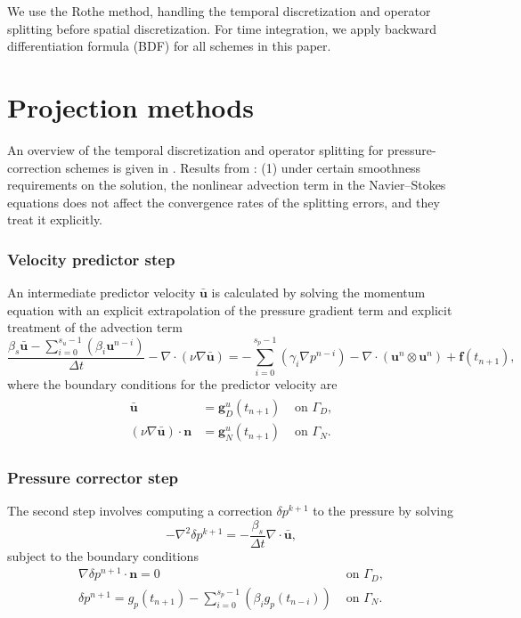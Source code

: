 We use the Rothe method, handling the temporal discretization and operator splitting before spatial discretization. For time integration, we apply backward differentiation formula (BDF) for all schemes in this paper.

\section{Projection methods}%

An overview of the temporal discretization and operator splitting for pressure-correction schemes is given in \cite{guermond_overview_2006}. Results from \cite{guermond_overview_2006}: (1) under certain smoothness requirements on the solution, the nonlinear advection term in the Navier--Stokes equations does not affect the convergence rates of the splitting errors, and they treat it explicitly. 

\subsubsection{Velocity predictor step}
An intermediate predictor velocity $\bar{\bm{u}}$ is calculated by solving the momentum equation with an explicit extrapolation of the pressure gradient term and explicit treatment of the advection term
\begin{equation}
\frac{ \beta_s \bar{\bm{u}} - \sum_{i=0}^{s_u-1}\left(\beta_i \bm{u}^{n-i}\right) }{\Delta t} 
- \nabla \cdot \left(\nu \nabla \bar{\bm{u}}\right) 
= - \sum_{i=0}^{s_p-1}\left(\gamma_i\nabla p^{n-i}\right) 
- \nabla \cdot \left(\bm{u}^n\otimes \bm{u}^n\right) 
+ \bm{f}(t_{n+1}),
\label{eq:PDE_velocity_predictor}
\end{equation}
where the boundary conditions for the predictor velocity are 
\begin{align}
  \begin{aligned}
  \bar{\bm{u}} &= \bm{g}_D^u(t_{n+1}) & \text{ on } \Gamma_D, \\
  \left(\nu \nabla \bar{\bm{u}}\right) \cdot \bm{n} &= \bm{g}_N^u(t_{n+1}) & \text{ on } \Gamma_N.
  \end{aligned}
  \label{eq:VP_BCs}
\end{align}

\subsubsection{Pressure corrector step}
The second step involves computing a correction $\delta p^{k+1}$ to the pressure by solving 
\begin{equation}
  -\nabla^2 \delta p^{k+1} = - \frac{\beta_s}{\Delta t} \nabla \cdot \bar{\bm{u}},
  \label{eq:PC_presure_poisson}
\end{equation}
subject to the boundary conditions
\begin{eqnarray}
    \nabla \delta p^{n+1} \cdot \bm{n} = 0 & \text{ on } \Gamma_D, \\
    \delta p^{n+1} = g_p(t_{n+1}) 
    - \sum_{i=0}^{s_p-1}\left(\beta_i g_p(t_{n-i})\right) & \text{ on }  \Gamma_N.
\label{eq:PDE_pressure_corrector}
\end{eqnarray}

